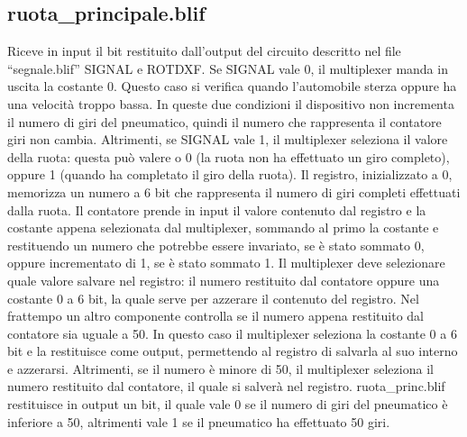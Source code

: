 \documentclass[a4paper,titlepage]{book}
\begin{document}
\subsection{ruota\_principale.blif}
Riceve in input il bit restituito dall'output del circuito descritto nel file ``segnale.blif'' SIGNAL e ROTDXF.  Se SIGNAL vale 0, il multiplexer manda in uscita la costante 0. Questo caso si verifica quando  l'automobile sterza oppure ha una velocità troppo bassa. In queste due  condizioni il dispositivo non incrementa il numero di giri del pneumatico, quindi il numero che rappresenta il contatore giri non cambia.  Altrimenti, se SIGNAL vale 1, il multiplexer seleziona il valore della ruota: questa può valere o 0 (la ruota non ha effettuato un giro completo), oppure 1 (quando ha completato il giro della ruota).  Il registro, inizializzato a 0, memorizza un numero a 6 bit che rappresenta il numero di giri  completi effettuati dalla ruota.  Il contatore prende in input il valore contenuto dal registro e la costante appena  selezionata dal multiplexer, sommando al primo la costante e restituendo un numero che  potrebbe essere invariato, se è stato sommato 0, oppure incrementato di 1, se è stato  sommato 1.  Il multiplexer deve selezionare quale valore salvare nel registro: il numero  restituito dal contatore oppure una costante 0 a 6 bit, la quale serve per azzerare il  contenuto del registro.  Nel frattempo un altro componente controlla se il numero appena restituito dal contatore  sia uguale a 50. In questo caso il multiplexer seleziona la costante 0 a 6 bit e la restituisce  come output, permettendo al registro di salvarla al suo interno e azzerarsi. Altrimenti, se il  numero è minore di 50, il multiplexer seleziona il numero restituito dal contatore, il quale si  salverà nel registro.  ruota\_princ.blif restituisce in output un bit, il quale vale 0 se il numero di giri del  pneumatico è inferiore a 50, altrimenti vale 1 se il pneumatico ha effettuato 50 giri.
\end{document}
